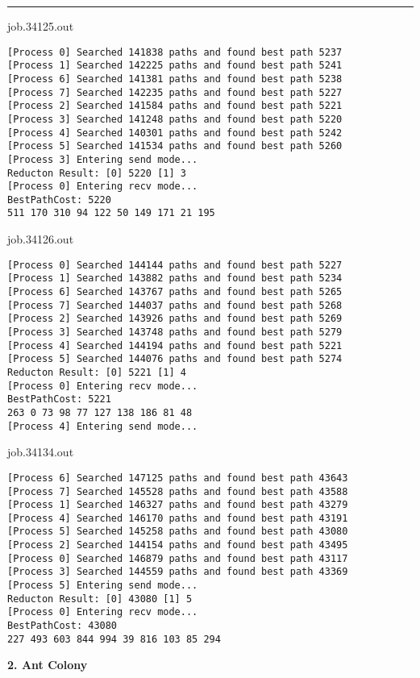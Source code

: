 \documentclass[letter, 12pt]{article}
\newenvironment{question}[1]{%
    \vspace{.2in}%
        \noindent{\bf #1}%
    \vspace{0.3em} \hrule \vspace{.1in}%
}{}
\begin{document}
\begin{question}{\large Appendix}
job.34125.out
\begin{lstlisting}[style=CStyle]
[Process 0] Searched 141838 paths and found best path 5237
[Process 1] Searched 142225 paths and found best path 5241
[Process 6] Searched 141381 paths and found best path 5238
[Process 7] Searched 142235 paths and found best path 5227
[Process 2] Searched 141584 paths and found best path 5221
[Process 3] Searched 141248 paths and found best path 5220
[Process 4] Searched 140301 paths and found best path 5242
[Process 5] Searched 141534 paths and found best path 5260
[Process 3] Entering send mode...
Reducton Result: [0] 5220 [1] 3
[Process 0] Entering recv mode...
BestPathCost: 5220
511 170 310 94 122 50 149 171 21 195 
\end{lstlisting}

job.34126.out
\begin{lstlisting}[style=CStyle]
[Process 0] Searched 144144 paths and found best path 5227
[Process 1] Searched 143882 paths and found best path 5234
[Process 6] Searched 143767 paths and found best path 5265
[Process 7] Searched 144037 paths and found best path 5268
[Process 2] Searched 143926 paths and found best path 5269
[Process 3] Searched 143748 paths and found best path 5279
[Process 4] Searched 144194 paths and found best path 5221
[Process 5] Searched 144076 paths and found best path 5274
Reducton Result: [0] 5221 [1] 4
[Process 0] Entering recv mode...
BestPathCost: 5221
263 0 73 98 77 127 138 186 81 48 
[Process 4] Entering send mode...
\end{lstlisting}

job.34134.out
\begin{lstlisting}[style=CStyle]
[Process 6] Searched 147125 paths and found best path 43643
[Process 7] Searched 145528 paths and found best path 43588
[Process 1] Searched 146327 paths and found best path 43279
[Process 4] Searched 146170 paths and found best path 43191
[Process 5] Searched 145258 paths and found best path 43080
[Process 2] Searched 144154 paths and found best path 43495
[Process 0] Searched 146879 paths and found best path 43117
[Process 3] Searched 144559 paths and found best path 43369
[Process 5] Entering send mode...
Reducton Result: [0] 43080 [1] 5
[Process 0] Entering recv mode...
BestPathCost: 43080
227 493 603 844 994 39 816 103 85 294
\end{lstlisting}

\vspace{\baselineskip}

\textbf{2. Ant Colony}\\


\end{question}
\end{document}
